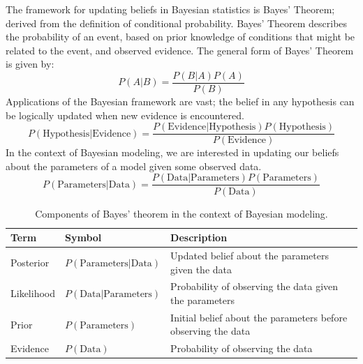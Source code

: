 The framework for updating beliefs in Bayesian statistics is Bayes' Theorem;
derived from the definition of conditional probability. Bayes' Theorem
describes the probability of an event, based on prior knowledge of conditions 
that might be related to the event, and observed evidence. 
The general form of Bayes' Theorem is given by:
\begin{equation}
  P(A|B) = \frac{P(B|A)P(A)}{P(B)}
\end{equation}
Applications of the Bayesian framework are vast; the belief in any hypothesis can
be logically updated when new evidence is encountered.
\begin{equation}
  P(\text{Hypothesis}|\text{Evidence}) = \frac{P(\text{Evidence}|\text{Hypothesis})P(\text{Hypothesis})}{P(\text{Evidence})}
\end{equation}
In the context of Bayesian modeling, we are interested in updating our beliefs
about the parameters of a model given some observed data.
\begin{equation}
  P(\text{Parameters}|\text{Data}) = \frac{P(\text{Data}|\text{Parameters})P(\text{Parameters})}{P(\text{Data})}
\end{equation}
\begin{table}[h]
\centering
\begin{tabular}{lll}
\toprule
Term & Symbol & Description \\
\midrule
Posterior & $P(\text{Parameters}|\text{Data})$ & Updated belief about the parameters given the data \\
Likelihood & $P(\text{Data}|\text{Parameters})$ & Probability of observing the data given the parameters \\
Prior & $P(\text{Parameters})$ & Initial belief about the parameters before observing the data \\
Evidence & $P(\text{Data})$ & Probability of observing the data \\
\bottomrule
\end{tabular}
\caption{Components of Bayes' theorem in the context of Bayesian modeling.}
\label{tab:bayes_theorem}
\end{table}

